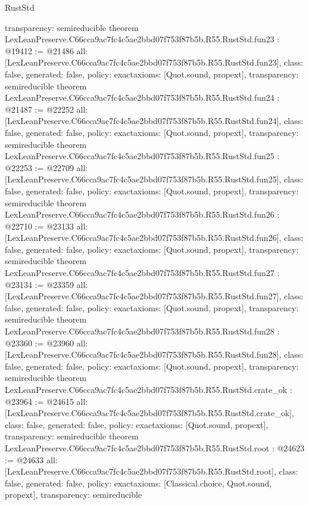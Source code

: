 \begin{lexlean}{RustStd}
\begin{coremodule}
{  transparency: semireducible
}
theorem LexLeanPreserve.C66cca9ac7fc4c5ae2bbd07f753f87b5b.R55.RustStd.fun23 : @19412 := @21486 {
  all: [LexLeanPreserve.C66cca9ac7fc4c5ae2bbd07f753f87b5b.R55.RustStd.fun23],
  class: false,
  generated: false,
  policy: exact{axioms: [Quot.sound, propext]},
  transparency: semireducible
}
theorem LexLeanPreserve.C66cca9ac7fc4c5ae2bbd07f753f87b5b.R55.RustStd.fun24 : @21487 := @22252 {
  all: [LexLeanPreserve.C66cca9ac7fc4c5ae2bbd07f753f87b5b.R55.RustStd.fun24],
  class: false,
  generated: false,
  policy: exact{axioms: [Quot.sound, propext]},
  transparency: semireducible
}
theorem LexLeanPreserve.C66cca9ac7fc4c5ae2bbd07f753f87b5b.R55.RustStd.fun25 : @22253 := @22709 {
  all: [LexLeanPreserve.C66cca9ac7fc4c5ae2bbd07f753f87b5b.R55.RustStd.fun25],
  class: false,
  generated: false,
  policy: exact{axioms: [Quot.sound, propext]},
  transparency: semireducible
}
theorem LexLeanPreserve.C66cca9ac7fc4c5ae2bbd07f753f87b5b.R55.RustStd.fun26 : @22710 := @23133 {
  all: [LexLeanPreserve.C66cca9ac7fc4c5ae2bbd07f753f87b5b.R55.RustStd.fun26],
  class: false,
  generated: false,
  policy: exact{axioms: [Quot.sound, propext]},
  transparency: semireducible
}
theorem LexLeanPreserve.C66cca9ac7fc4c5ae2bbd07f753f87b5b.R55.RustStd.fun27 : @23134 := @23359 {
  all: [LexLeanPreserve.C66cca9ac7fc4c5ae2bbd07f753f87b5b.R55.RustStd.fun27],
  class: false,
  generated: false,
  policy: exact{axioms: [Quot.sound, propext]},
  transparency: semireducible
}
theorem LexLeanPreserve.C66cca9ac7fc4c5ae2bbd07f753f87b5b.R55.RustStd.fun28 : @23360 := @23960 {
  all: [LexLeanPreserve.C66cca9ac7fc4c5ae2bbd07f753f87b5b.R55.RustStd.fun28],
  class: false,
  generated: false,
  policy: exact{axioms: [Quot.sound, propext]},
  transparency: semireducible
}
theorem LexLeanPreserve.C66cca9ac7fc4c5ae2bbd07f753f87b5b.R55.RustStd.crate_ok : @23964 := @24615 {
  all: [LexLeanPreserve.C66cca9ac7fc4c5ae2bbd07f753f87b5b.R55.RustStd.crate_ok],
  class: false,
  generated: false,
  policy: exact{axioms: [Quot.sound, propext]},
  transparency: semireducible
}
theorem LexLeanPreserve.C66cca9ac7fc4c5ae2bbd07f753f87b5b.R55.RustStd.root : @24623 := @24633 {
  all: [LexLeanPreserve.C66cca9ac7fc4c5ae2bbd07f753f87b5b.R55.RustStd.root],
  class: false,
  generated: false,
  policy: exact{axioms: [Classical.choice, Quot.sound, propext]},
  transparency: semireducible
}


\end{coremodule}
\end{lexlean}
